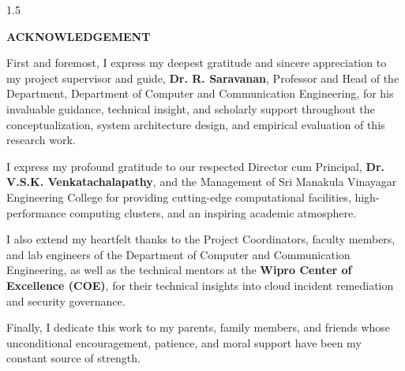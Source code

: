 \documentclass[12pt,a4paper]{report}
\newcommand{\headingfourteen}{\fontsize{14pt}{18pt}\selectfont\bfseries}
\begin{document}
\newpage
\thispagestyle{empty}
\begin{spacing}{1.5}
\setlength{\parskip}{4pt}
\begin{center}
    {\headingfourteen ACKNOWLEDGEMENT\par}
    \vspace{0.4cm}
\end{center}

First and foremost, I express my deepest gratitude and sincere appreciation to my project supervisor and guide, \textbf{Dr. R. Saravanan}, Professor and Head of the Department, Department of Computer and Communication Engineering, for his invaluable guidance, technical insight, and scholarly support throughout the conceptualization, system architecture design, and empirical evaluation of this research work.

I express my profound gratitude to our respected Director cum Principal, \textbf{Dr. V.S.K. Venkatachalapathy}, and the Management of Sri Manakula Vinayagar Engineering College for providing cutting-edge computational facilities, high-performance computing clusters, and an inspiring academic atmosphere.

I also extend my heartfelt thanks to the Project Coordinators, faculty members, and lab engineers of the Department of Computer and Communication Engineering, as well as the technical mentors at the \textbf{Wipro Center of Excellence (COE)}, for their technical insights into cloud incident remediation and security governance.

Finally, I dedicate this work to my parents, family members, and friends whose unconditional encouragement, patience, and moral support have been my constant source of strength.
\end{spacing}
\end{document}
